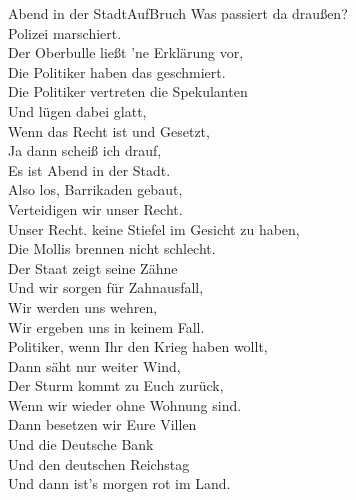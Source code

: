 \begin{lied}{Abend in der Stadt}{AufBruch}
Was passiert da draußen?\\
Polizei marschiert.\\
Der Oberbulle ließt 'ne Erklärung vor,\\
Die Politiker haben das geschmiert.\\
Die Politiker vertreten die Spekulanten\\
Und lügen dabei glatt,\\
Wenn das Recht ist und Gesetzt,\\
Ja dann scheiß ich drauf,\\
Es ist Abend in der Stadt.\\

Also los, Barrikaden gebaut,\\
Verteidigen wir unser Recht.\\
Unser Recht. keine Stiefel im Gesicht zu haben,\\
Die Mollis brennen nicht schlecht.\\
Der Staat zeigt seine Zähne\\
Und wir sorgen für Zahnausfall,\\
Wir werden uns wehren,\\
Wir ergeben uns in keinem Fall.\\

Politiker, wenn Ihr den Krieg haben wollt,\\
Dann säht nur weiter Wind,\\
Der Sturm kommt zu Euch zurück,\\
Wenn wir wieder ohne Wohnung sind.\\
Dann besetzen wir Eure Villen\\
Und die Deutsche Bank\\
Und den deutschen Reichstag\\
Und dann ist's morgen rot im Land.\\
\end{lied}